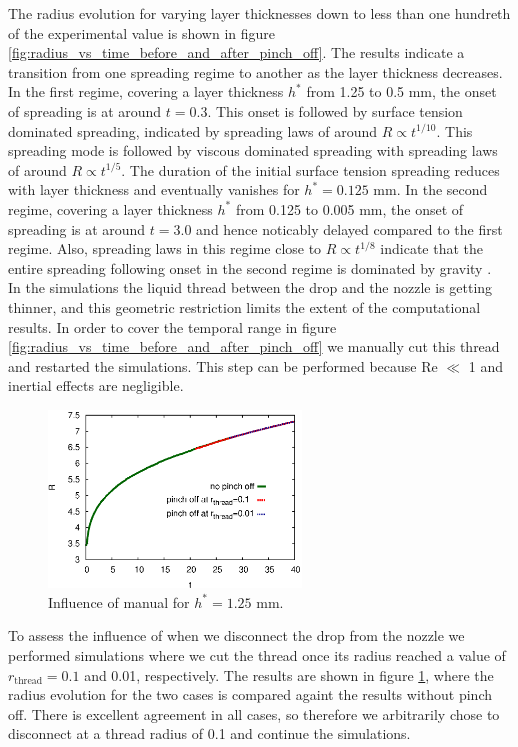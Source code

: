 \documentclass[aip,graphicx]{revtex4-1}
\newcommand{\sym}[1]{\text{#1}} \newcommand{\dif}{\mathrm{d}}
\begin{document}
The radius evolution for varying layer thicknesses down to less than
one hundreth of the experimental value is shown in figure
\ref{fig:radius_vs_time_before_and_after_pinch_off}.  The results
indicate a transition from one spreading regime to another as the
layer thickness decreases.  In the first regime, covering a layer
thickness $h^*$ from 1.25 to 0.5 mm, the onset of spreading is at
around $t=0.3$.  This onset is followed by surface tension dominated
spreading, indicated by spreading laws of around $R \propto t^{1/10}$.
This spreading mode is followed by viscous dominated spreading with
spreading laws of around $R \propto t^{1/5}$.  The duration of the
initial surface tension spreading reduces with layer thickness and
eventually vanishes for $h^*=0.125$ mm.  In the second regime,
covering a layer thickness $h^*$ from 0.125 to 0.005 mm, the onset of
spreading is at around $t=3.0$ and hence noticably delayed compared to
the first regime.  Also, spreading laws in this regime close to $R
\propto t^{1/8}$ indicate that the entire spreading following onset in
the second regime is dominated by gravity
\cite{cazabat1986dynamics}. \\


In the simulations the liquid thread between the drop and the nozzle
is getting thinner, and this geometric restriction limits the extent
of the computational results.  In order to cover the temporal range in
figure \ref{fig:radius_vs_time_before_and_after_pinch_off} we manually
cut this thread and restarted the simulations.  This step can be
performed because Re $\ll$ 1 and inertial effects are negligible.

\begin{figure}[!ht]
\centering
\includegraphics[width=0.6\textwidth]{figures/radius_vs_time_influence_pinch_off.eps}
\caption{Influence of manual for $h^*=1.25$ mm.}
\label{fig:radius_vs_time_influence_pinch_off}
\end{figure}

To assess the influence of when we disconnect the drop from the nozzle
we performed simulations where we cut the thread once its radius
reached a value of $r_{\sym{thread}}=0.1$ and 0.01, respectively.  The
results are shown in figure
\ref{fig:radius_vs_time_influence_pinch_off}, where the radius
evolution for the two cases is compared againt the results without
pinch off.  There is excellent agreement in all cases, so therefore we
arbitrarily chose to disconnect at a thread radius of 0.1 and continue
the simulations. \\
\end{document}
